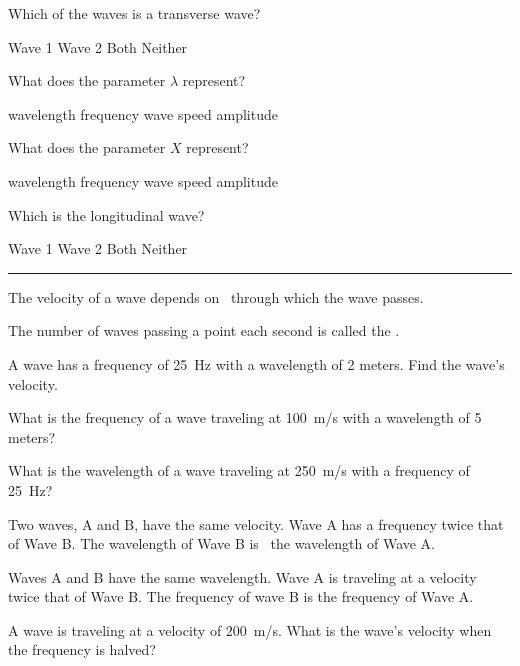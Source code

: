\documentclass[]{exam}
\begin{document}
\begin{questions}
\question \label{Q1}
Which of the waves is a transverse wave?

\begin{randomizechoices}[norandomize]
    \choice Wave 1
    \correctchoice Wave 2
    \choice Both
    \choice Neither
\end{randomizechoices}

\question 
What does the parameter $\lambda$ represent?

\begin{randomizechoices}
    \correctchoice wavelength
    \choice frequency
    \choice wave speed
    \choice amplitude
\end{randomizechoices}

\question 
What does the parameter $X$ represent?

\begin{randomizechoices}
    \choice wavelength
    \choice frequency
    \choice wave speed
    \correctchoice amplitude
\end{randomizechoices}

\question \label{Q4}
Which is the longitudinal wave?

\begin{randomizechoices}[norandomize]
    \correctchoice Wave 1
    \choice Wave 2
    \choice Both
    \choice Neither
\end{randomizechoices}

\bigskip

\hrule

\question
The velocity of a wave depends on \fillin[medium]\ through which the wave passes.

\question
The number of waves passing a point each second is called the \fillin[frequency].

\question
A wave has a frequency of \SI{25}{Hz} with a wavelength of 2 meters. Find the wave's velocity.

\question
What is the frequency of a wave traveling at \SI{100}{m/s} with a wavelength of 5 meters?

\question
What is the wavelength of a wave traveling at \SI{250}{m/s} with a frequency of \SI{25}{Hz}?

\question
Two waves, A and B, have the same velocity. Wave A has a frequency twice that of Wave B. The wavelength of Wave B is \fillin[twice]\ the wavelength of Wave A.

\question
Waves A and B have the same wavelength. Wave A is traveling at a velocity twice that of Wave B. The frequency of wave B is \fillin[half] the frequency of Wave A. 

\question
A wave is traveling at a velocity of \SI{200}{m/s}. What is the wave's velocity when the frequency is halved?

\end{questions}
\end{document}

